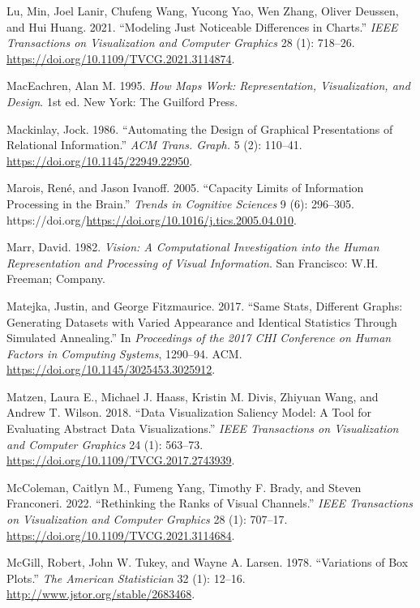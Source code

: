 \documentclass[
  letterpaper,
  DIV=11,
  numbers=noendperiod]{scrreprt}
\newlength{\cslhangindent}
\newenvironment{CSLReferences}[2] %
 {\begin{list}{}{%
  \setlength{\itemindent}{0pt}
  \setlength{\leftmargin}{0pt}
  \setlength{\parsep}{0pt}
  \ifodd #1
   \setlength{\leftmargin}{\cslhangindent}
   \setlength{\itemindent}{-1\cslhangindent}
  \fi
  \setlength{\itemsep}{#2\baselineskip}}}
 {\end{list}}
\begin{document}
\begin{CSLReferences}{1}{0}
Lu, Min, Joel Lanir, Chufeng Wang, Yucong Yao, Wen Zhang, Oliver
Deussen, and Hui Huang. 2021. {``Modeling Just Noticeable Differences in
Charts.''} \emph{IEEE Transactions on Visualization and Computer
Graphics} 28 (1): 718--26.
\url{https://doi.org/10.1109/TVCG.2021.3114874}.

MacEachren, Alan M. 1995. \emph{How Maps Work: Representation,
Visualization, and Design}. 1st ed. New York: The Guilford Press.

Mackinlay, Jock. 1986. {``Automating the Design of Graphical
Presentations of Relational Information.''} \emph{ACM Trans. Graph.} 5
(2): 110--41. \url{https://doi.org/10.1145/22949.22950}.

Marois, René, and Jason Ivanoff. 2005. {``Capacity Limits of Information
Processing in the Brain.''} \emph{Trends in Cognitive Sciences} 9 (6):
296--305.
https://doi.org/\url{https://doi.org/10.1016/j.tics.2005.04.010}.

Marr, David. 1982. \emph{Vision: A Computational Investigation into the
Human Representation and Processing of Visual Information}. San
Francisco: W.H. Freeman; Company.

Matejka, Justin, and George Fitzmaurice. 2017. {``Same Stats, Different
Graphs: Generating Datasets with Varied Appearance and Identical
Statistics Through Simulated Annealing.''} In \emph{Proceedings of the
2017 CHI Conference on Human Factors in Computing Systems}, 1290--94.
ACM. \url{https://doi.org/10.1145/3025453.3025912}.

Matzen, Laura E., Michael J. Haass, Kristin M. Divis, Zhiyuan Wang, and
Andrew T. Wilson. 2018. {``Data Visualization Saliency Model: A Tool for
Evaluating Abstract Data Visualizations.''} \emph{IEEE Transactions on
Visualization and Computer Graphics} 24 (1): 563--73.
\url{https://doi.org/10.1109/TVCG.2017.2743939}.

McColeman, Caitlyn M., Fumeng Yang, Timothy F. Brady, and Steven
Franconeri. 2022. {``Rethinking the Ranks of Visual Channels.''}
\emph{IEEE Transactions on Visualization and Computer Graphics} 28 (1):
707--17. \url{https://doi.org/10.1109/TVCG.2021.3114684}.

McGill, Robert, John W. Tukey, and Wayne A. Larsen. 1978. {``Variations
of Box Plots.''} \emph{The American Statistician} 32 (1): 12--16.
\url{http://www.jstor.org/stable/2683468}.


\end{CSLReferences}
\end{document}
